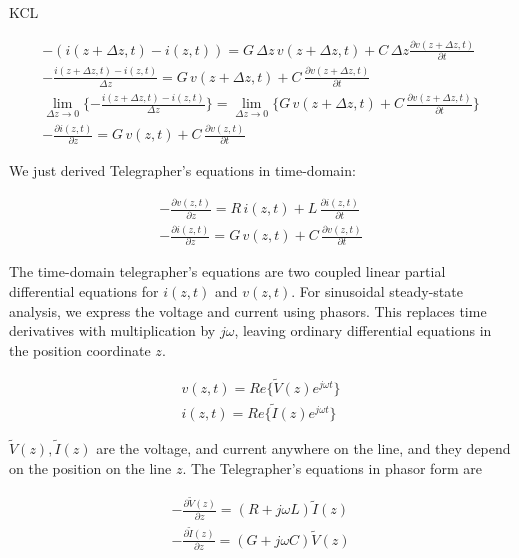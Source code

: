 \documentclass{ximera}
\begin{document}
KCL

\begin{eqnarray}
-( i(z+ \Delta z ,t)- i(z,t))= G  \, \Delta z  \, v(z+\Delta z,t)+ C \, \Delta z
\frac{\partial v(z+\Delta z,t)}{\partial t} \label{te1kc11} \\
-\frac{ i(z+ \Delta z ,t)- i(z,t)}{\Delta z}= G  \, v(z+\Delta z,t)+C \, 
\frac{\partial v(z+\Delta z,t)}{\partial t} \label{te1kc21} \\
\lim_{\Delta z \to 0} \{-\frac{ i(z+ \Delta z ,t)- i(z,t)}{\Delta z} \}= \lim_{\Delta z \to 0} \{ G  \, v(z+\Delta z,t)+C \, 
\frac{\partial v(z+\Delta z,t)}{\partial t} \} \label{te1kc211} \\
-\frac{\partial i(z,t)}{\partial z}= G \, v(z,t)+C \,
\frac{\partial v(z,t)}{\partial t} \label{te1kc31}
\end{eqnarray}



We just derived Telegrapher's equations in time-domain:



\begin{eqnarray}
-\frac{\partial v(z,t)}{\partial z}=R \, i(z,t)+L \,
 \frac{\partial i(z,t)}{\partial t} \nonumber  \\ \nonumber
-\frac{\partial i(z,t)}{\partial z}= G \, v(z,t)+C \,
\frac{\partial v(z,t)}{\partial t}
\end{eqnarray}


The time-domain telegrapher's equations are two coupled
linear partial differential equations for $i(z,t)$ and $v(z,t)$.
For sinusoidal steady-state analysis, we express the voltage
and current using phasors. This replaces time derivatives
with multiplication by $j\omega$, leaving ordinary differential
equations in the position coordinate $z$.

\begin{eqnarray}
v(z,t)=Re\{ \tilde{V}(z) e^{j \omega t} \} \nonumber \\
i(z,t)=Re\{ \tilde{I}(z) e^{j \omega t} \} \nonumber
\end{eqnarray}

 $\tilde{V}(z),\tilde{I}(z) $ are the voltage, and current anywhere on the line, and they depend on the position on the line $z$. The Telegrapher's equations in phasor form are


\begin{eqnarray}
-\frac{\partial \tilde{V}(z)}{\partial z} = (R+j\omega L) \tilde{I}(z) \label{te11}\\
-\frac{\partial \tilde{I}(z)}{\partial z} = (G+j\omega C) \tilde{V}(z) \label{te121}
\end{eqnarray}
\end{document}
